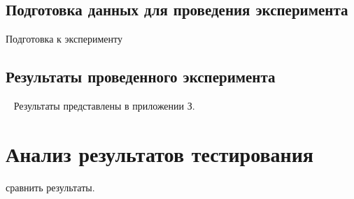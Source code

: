 \subsection{Подготовка данных для проведения эксперимента}\par
\hspace*{12.5 mm}Подготовка к эксперименту

\subsection{Результаты проведенного эксперимента}\
\hspace*{12.5 mm}
Результаты представлены в приложении З.

\section{Анализ результатов тестирования}
\hspace*{12.5 mm}сравнить результаты.
